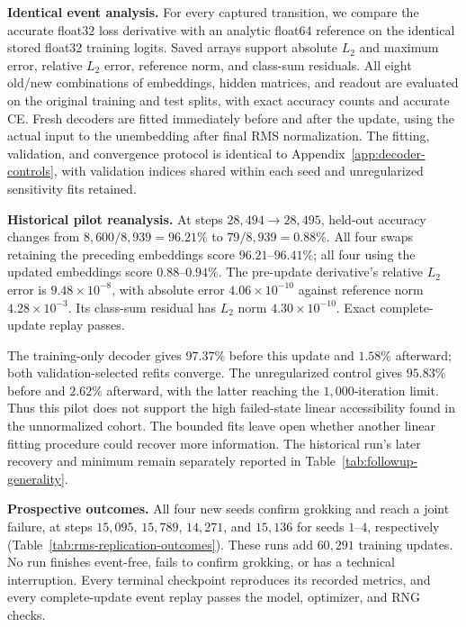 \textbf{Identical event analysis.} For every captured transition, we compare the accurate float32 loss derivative with an analytic float64 reference on the identical stored float32 training logits. Saved arrays support absolute $L_2$ and maximum error, relative $L_2$ error, reference norm, and class-sum residuals. All eight old/new combinations of embeddings, hidden matrices, and readout are evaluated on the original training and test splits, with exact accuracy counts and accurate CE. Fresh decoders are fitted immediately before and after the update, using the actual input to the unembedding after final RMS normalization. The fitting, validation, and convergence protocol is identical to Appendix~\ref{app:decoder-controls}, with validation indices shared within each seed and unregularized sensitivity fits retained.

\textbf{Historical pilot reanalysis.} At steps $28{,}494\to28{,}495$, held-out accuracy changes from $8{,}600/8{,}939=96.21\%$ to $79/8{,}939=0.88\%$. All four swaps retaining the preceding embeddings score $96.21$--$96.41\%$; all four using the updated embeddings score $0.88$--$0.94\%$. The pre-update derivative's relative $L_2$ error is $9.48\times10^{-8}$, with absolute error $4.06\times10^{-10}$ against reference norm $4.28\times10^{-3}$. Its class-sum residual has $L_2$ norm $4.30\times10^{-10}$. Exact complete-update replay passes.

The training-only decoder gives $97.37\%$ before this update and $1.58\%$ afterward; both validation-selected refits converge. The unregularized control gives $95.83\%$ before and $2.62\%$ afterward, with the latter reaching the $1{,}000$-iteration limit. Thus this pilot does not support the high failed-state linear accessibility found in the unnormalized cohort. The bounded fits leave open whether another linear fitting procedure could recover more information. The historical run's later recovery and minimum remain separately reported in Table~\ref{tab:followup-generality}.

\textbf{Prospective outcomes.} All four new seeds confirm grokking and reach a joint failure, at steps $15{,}095$, $15{,}789$, $14{,}271$, and $15{,}136$ for seeds $1$--$4$, respectively (Table~\ref{tab:rms-replication-outcomes}). These runs add $60{,}291$ training updates. No run finishes event-free, fails to confirm grokking, or has a technical interruption. Every terminal checkpoint reproduces its recorded metrics, and every complete-update event replay passes the model, optimizer, and RNG checks.

